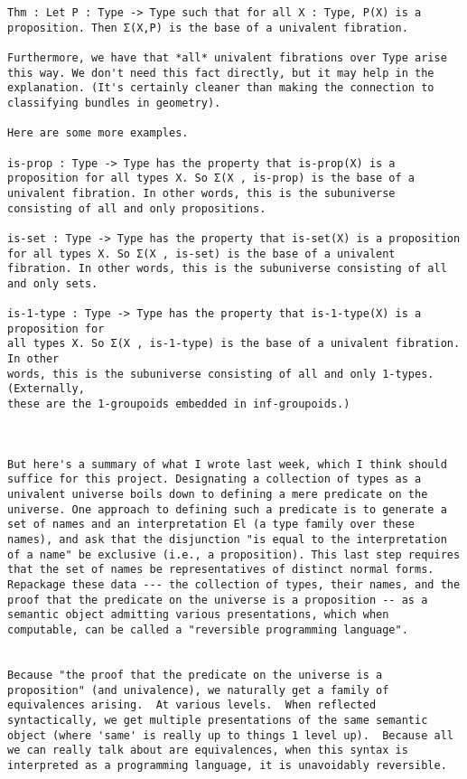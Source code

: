 \documentclass{entcs}
\begin{document}
\begin{verbatim}
Thm : Let P : Type -> Type such that for all X : Type, P(X) is a proposition. Then Σ(X,P) is the base of a univalent fibration.

Furthermore, we have that *all* univalent fibrations over Type arise this way. We don't need this fact directly, but it may help in the explanation. (It's certainly cleaner than making the connection to classifying bundles in geometry).

Here are some more examples.

is-prop : Type -> Type has the property that is-prop(X) is a proposition for all types X. So Σ(X , is-prop) is the base of a univalent fibration. In other words, this is the subuniverse consisting of all and only propositions.

is-set : Type -> Type has the property that is-set(X) is a proposition for all types X. So Σ(X , is-set) is the base of a univalent fibration. In other words, this is the subuniverse consisting of all and only sets.

is-1-type : Type -> Type has the property that is-1-type(X) is a proposition for
all types X. So Σ(X , is-1-type) is the base of a univalent fibration. In other
words, this is the subuniverse consisting of all and only 1-types. (Externally,
these are the 1-groupoids embedded in inf-groupoids.)



But here's a summary of what I wrote last week, which I think should suffice for this project. Designating a collection of types as a univalent universe boils down to defining a mere predicate on the universe. One approach to defining such a predicate is to generate a set of names and an interpretation El (a type family over these names), and ask that the disjunction "is equal to the interpretation of a name" be exclusive (i.e., a proposition). This last step requires that the set of names be representatives of distinct normal forms. Repackage these data --- the collection of types, their names, and the proof that the predicate on the universe is a proposition -- as a semantic object admitting various presentations, which when computable, can be called a "reversible programming language".


Because "the proof that the predicate on the universe is a proposition" (and univalence), we naturally get a family of equivalences arising.  At various levels.  When reflected syntactically, we get multiple presentations of the same semantic object (where 'same' is really up to things 1 level up).  Because all we can really talk about are equivalences, when this syntax is interpreted as a programming language, it is unavoidably reversible.


\end{verbatim}
\end{document}
